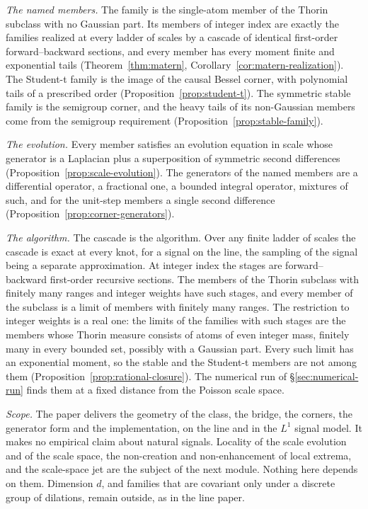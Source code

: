 \emph{The named members.} The \Matern{} family is the single-atom member of the Thorin
subclass with no Gaussian part. Its members of integer index are exactly the families
realized at every ladder of scales by a cascade of identical first-order forward--backward
sections, and every member has every moment finite and exponential tails
(Theorem~\ref{thm:matern},
Corollary~\ref{cor:matern-realization}). The Student-t family is the image of the causal Bessel
corner, with polynomial tails of a prescribed order (Proposition~\ref{prop:student-t}). The
symmetric stable family is the semigroup corner, and the heavy tails of its non-Gaussian
members come from the semigroup requirement (Proposition~\ref{prop:stable-family}).

\emph{The evolution.} Every member satisfies an evolution equation in scale whose generator is
a Laplacian plus a superposition of symmetric second differences
(Proposition~\ref{prop:scale-evolution}). The generators of the named members are a
differential operator, a fractional one, a bounded integral operator, mixtures of such, and
for the unit-step members a single second difference
(Proposition~\ref{prop:corner-generators}).

\emph{The algorithm.} The cascade is the algorithm. Over any finite ladder of scales the
cascade is exact at every knot, for a signal on the line, the sampling of the signal being a
separate approximation. At integer index the \Matern{} stages are forward--backward
first-order recursive sections. The members of the Thorin subclass with finitely many ranges
and integer weights have such stages, and every member of the subclass is a limit of members
with finitely many ranges. The restriction to integer weights is a real one: the limits of
the families with such stages are the members whose Thorin measure consists of atoms of even
integer mass, finitely many in every bounded set, possibly with a Gaussian part. Every such
limit has an exponential moment, so the stable and the Student-t members are not among them
(Proposition~\ref{prop:rational-closure}). The numerical run of \S\ref{sec:numerical-run} finds them at a fixed distance from the Poisson
scale space.

\emph{Scope.} The paper delivers the geometry of the class, the bridge, the corners, the
generator form and the implementation, on the line and in the $L^1$ signal model. It makes no
empirical claim about natural signals. Locality of the scale evolution and of the scale space,
the non-creation and non-enhancement of local extrema, and the scale-space jet are the subject
of the next module. Nothing here depends on them. Dimension $d$, and families that are
covariant only under a discrete group of dilations, remain outside, as in the line paper.


